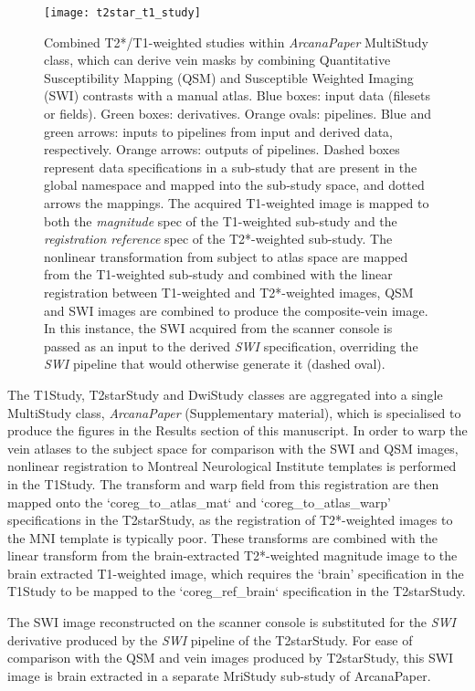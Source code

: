 \documentclass[smallextended]{svjour3}       %
\begin{document}
\begin{figure*}
	\centering
    \texttt{[image: t2star\_t1\_study]}
  \caption{Combined T2*/T1-weighted studies within \emph{ArcanaPaper}
  MultiStudy class, which can derive vein masks by combining Quantitative Susceptibility
Mapping (QSM) and Susceptible Weighted Imaging (SWI) contrasts with a
manual atlas. Blue boxes: input data (filesets or fields).
Green boxes: derivatives. Orange ovals: pipelines. Blue and green
arrows: inputs to pipelines from input and derived data, respectively. Orange
arrows: outputs of pipelines. Dashed boxes represent data specifications
in a sub-study that are present in the global namespace and mapped into
the sub-study space, and dotted arrows the mappings. The acquired
T1-weighted image is mapped to both the \emph{magnitude} spec of the
T1-weighted sub-study and the \emph{registration reference} spec of the
T2*-weighted sub-study. The nonlinear transformation from subject to
atlas space are mapped from the T1-weighted sub-study and combined with
the linear registration between T1-weighted and T2*-weighted images, QSM
and SWI images are combined to produce the composite-vein image. In this
instance, the SWI acquired from the scanner console is passed
as an input to the derived \emph{SWI} specification, overriding the
\emph{SWI} pipeline that would otherwise generate it (dashed oval).}
\label{fig:t2star_t1_study}
\end{figure*} 

The T1Study, T2starStudy and DwiStudy classes are
aggregated into a single MultiStudy class,
\emph{ArcanaPaper} (Supplementary material), which is specialised to produce
the figures in the Results section of this manuscript. In order to warp the
vein atlases to the subject space for comparison with the SWI and QSM images,
nonlinear registration to Montreal Neurological Institute templates
\citep{grabner_symmetric_2006} is performed in the T1Study. The transform and warp
field from this registration are then mapped onto the `coreg\_to\_atlas\_mat` and
`coreg\_to\_atlas\_warp' specifications in the T2starStudy, as the registration of
T2*-weighted images to the MNI template is typically poor.
These transforms are combined with the linear transform from the
brain-extracted T2*-weighted magnitude image to the brain extracted T1-weighted image,
which requires the `brain' specification in the T1Study to be mapped
to the `coreg\_ref\_brain` specification in the T2starStudy.

The SWI image reconstructed on the scanner console is substituted for the \emph{SWI} derivative
produced by the \emph{SWI} pipeline of the T2starStudy. For ease of comparison
with the QSM and vein images produced by T2starStudy, this SWI image is brain extracted
in a separate MriStudy sub-study of ArcanaPaper.
\end{document}
